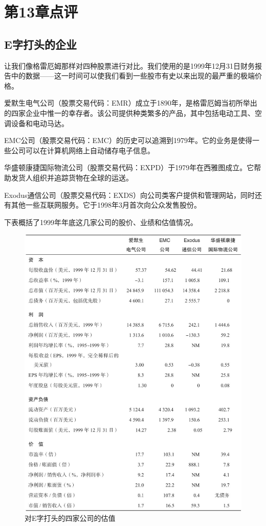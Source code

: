 \documentclass[12pt,oneside]{book}
\begin{document}
\section{第13章点评}
\subsection{E字打头的企业}
让我们像格雷厄姆那样对四种股票进行对比。我们使用的是1999年12月31日财务报告中的数据——这一时间可以使我们看到一些股市有史以来出现的最严重的极端价格。

爱默生电气公司（股票交易代码：EMR）成立于1890年，是格雷厄姆当初所举出的四家企业中惟一的幸存者。该公司提供种类繁多的产品，其中包括电动工具、空调设备和电动马达。

EMC公司（股票交易代码：EMC）的历史可以追溯到1979年。它的业务是使得一些公司可以在计算机网络上自动储存电子信息。

华盛顿康捷国际物流公司（股票交易代码：EXPD）于1979年在西雅图成立。它帮助发货人组织并追踪货物在全球的运送。

Exodus通信公司（股票交易代码：EXDS）向公司类客户提供和管理网站，同时还有其他一些互联网服务。它于1998年3月首次向公众发售股份。

下表概括了1999年年底这几家公司的股价、业绩和估值情况。

\begin{figure}[H]
\centering
\includegraphics[width=\linewidth ,totalheight=0.95\textheight , keepaspectratio]{对E字打头的四家公司的估值.jpg}
\caption{对E字打头的四家公司的估值}
\end{figure}
\end{document}
